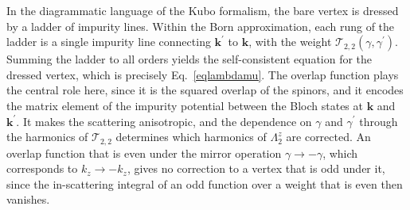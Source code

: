 \documentclass[aps,prb,onecolumn,nofootinbib,citeautoscript,10pt]{revtex4-2}
\newcommand{\bs}[1]{\boldsymbol{#1}}
\begin{document}
In the diagrammatic language of the Kubo formalism, the bare vertex is dressed by a ladder of impurity lines. Within the Born approximation, each rung of the ladder is a single impurity line connecting $\bs k^\prime$ to $\bs k$, with the weight $\mathcal T_{2,2}(\gamma,\gamma^\prime)$. Summing the ladder to all orders yields the self-consistent equation for the dressed vertex, which is precisely Eq.~\eqref{eqlambdamu}. The overlap function plays the central role here, since it is the squared overlap of the spinors, and it encodes the matrix element of the impurity potential between the Bloch states at $\bs k$ and $\bs k^\prime$. It makes the scattering anisotropic, and the dependence on $\gamma$ and $\gamma^\prime$ through the harmonics of $\mathcal T_{2,2}$ determines which harmonics of $\Lambda^z_2$ are corrected. An overlap function that is even under the mirror operation $\gamma\to-\gamma$, which corresponds to $k_z\to-k_z$, gives no correction to a vertex that is odd under it, since the in-scattering integral of an odd function over a weight that is even then vanishes.
\end{document}
